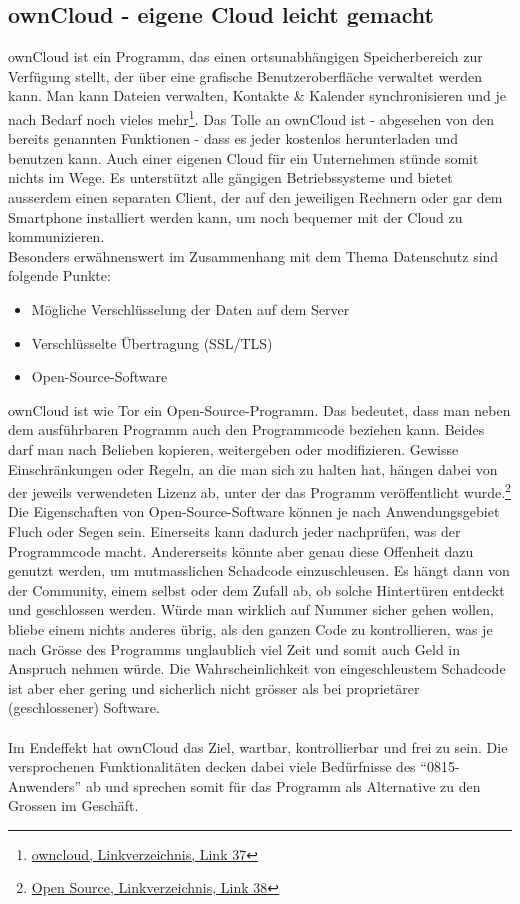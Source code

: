 \subsection{ownCloud - eigene Cloud leicht gemacht}
ownCloud ist ein Programm, das einen ortsunabhängigen Speicherbereich zur Verfügung stellt, der über eine grafische Benutzeroberfläche verwaltet werden kann. Man kann Dateien verwalten, Kontakte \& Kalender synchronisieren und je nach Bedarf noch vieles mehr\footnote{\hyperlink{link37}{owncloud, Linkverzeichnis, Link 37}}.
Das Tolle an ownCloud ist - abgesehen von den bereits genannten Funktionen - dass es jeder kostenlos herunterladen und benutzen kann. Auch einer eigenen Cloud für ein Unternehmen stünde somit nichts im Wege. Es unterstützt alle gängigen Betriebssysteme und bietet ausserdem einen separaten Client, der auf den jeweiligen Rechnern oder gar dem Smartphone installiert werden kann, um noch bequemer mit der Cloud zu kommunizieren.
\\
Besonders erwähnenswert im Zusammenhang mit dem Thema Datenschutz sind folgende Punkte:

\begin{itemize}
\item Mögliche Verschlüsselung der Daten auf dem Server
\item Verschlüsselte Übertragung (SSL/TLS)
\item Open-Source-Software
\end{itemize}

ownCloud ist wie Tor ein Open-Source-Programm. Das bedeutet, dass man neben dem ausführbaren Programm auch den Programmcode beziehen kann. Beides darf man nach Belieben kopieren, weitergeben oder modifizieren. Gewisse Einschränkungen oder Regeln, an die man sich zu halten hat, hängen dabei von der jeweils verwendeten Lizenz ab, unter der das Programm veröffentlicht wurde.\footnote{\hyperlink{link38}{Open Source, Linkverzeichnis, Link 38}}
Die Eigenschaften von Open-Source-Software können je nach Anwendungsgebiet Fluch oder Segen sein. Einerseits kann dadurch jeder nachprüfen, was der Programmcode macht. Andererseits könnte aber genau diese Offenheit dazu genutzt werden, um mutmasslichen Schadcode einzuschleusen. Es hängt dann von der Community, einem selbst oder dem Zufall ab, ob solche Hintertüren entdeckt und geschlossen werden. Würde man wirklich auf Nummer sicher gehen wollen, bliebe einem nichts anderes übrig, als den ganzen Code zu kontrollieren, was je nach Grösse des Programms unglaublich viel Zeit und somit auch Geld in Anspruch nehmen würde. Die Wahrscheinlichkeit von eingeschleustem Schadcode ist aber eher gering und sicherlich nicht grösser als bei proprietärer (geschlossener) Software.
\\
\\
Im Endeffekt hat ownCloud das Ziel, wartbar, kontrollierbar und frei zu sein. Die versprochenen Funktionalitäten decken dabei viele Bedürfnisse des ``0815-Anwenders'' ab und sprechen somit für das Programm als Alternative zu den Grossen im Geschäft.

